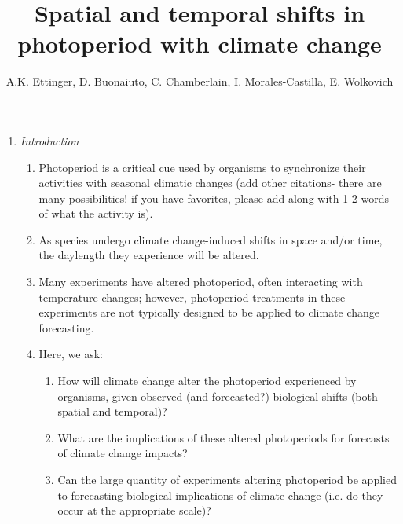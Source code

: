 \documentclass{article}
\begin{document}
 
\title{Spatial and temporal shifts in photoperiod with climate change} %

\author{A.K. Ettinger, D. Buonaiuto, C. Chamberlain, I. Morales-Castilla, E. Wolkovich}
\maketitle  %
\begin{enumerate}
\item \textit{Introduction}
\begin{enumerate}
\item Photoperiod is a critical cue used by organisms to synchronize their activities with seasonal climatic changes (add other citations- there are many possibilities! if you have favorites, please add along with 1-2 words of what the activity is)\citep[e.g.,][]{hsu2011,singh2017}.
\item As species undergo climate change-induced shifts in space and/or time, the daylength they experience will be altered. 
\item Many experiments have altered photoperiod, often interacting with temperature changes; however, photoperiod treatments in these experiments are not typically designed to be applied to climate change forecasting. 
\item Here, we ask: 
\begin{enumerate}
\item How will climate change alter the photoperiod experienced by organisms, given observed (and forecasted?) biological shifts (both spatial and temporal)?
\item What are the implications of these altered photoperiods for forecasts of climate change impacts?
\item Can the large quantity of experiments altering photoperiod be applied to forecasting biological implications of climate change (i.e. do they occur at the appropriate scale)?
\end{enumerate}
\end{enumerate}


\end{enumerate}
\end{document}
